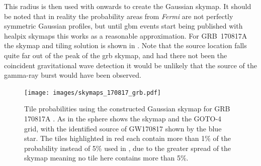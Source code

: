 \begin{colsection}
\begin{colsection}
This radius is then used with  onwards to create the Gaussian skymap. It should be noted that in reality the probability areas from \textit{Fermi} are not perfectly symmetric Gaussian profiles, but until \gls{gbm} events start being published with \gls{healpix} skymaps this works as a reasonable approximation. For GRB~170817A the skymap and tiling solution is shown in . Note that the source location falls quite far out of the peak of the \gls{grb} skymap, and had there not been the coincident gravitational wave detection it would be unlikely that the source of the gamma-ray burst would have been observed.

\begin{figure}[p]
\begin{center}
\texttt{[image: images/skymaps\_170817\_grb.pdf]}
\end{center}
\caption[Tile probabilities for GRB 170817A]{Tile probabilities using the constructed Gaussian skymap for GRB 170817A \citep{GW170817_Fermi}. As in  the sphere shows the skymap and the GOTO-4 grid, with the identified source of GW170817 shown by the blue star. The tiles highlighted in red each contain more than 1\% of the probability instead of 5\% used in , due to the greater spread of the skymap meaning no tile here contains more than 5\%.
}
\label{fig:170817_grb}
\end{figure}

\end{colsection}


\end{colsection}


\newpage
